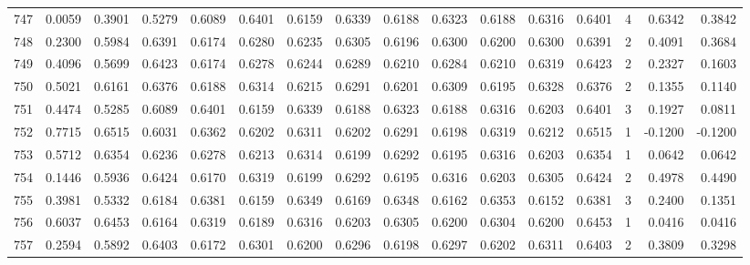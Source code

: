 \begin{tabular}{lrrrrrrrrrrrrrrr}
747 &      0.0059 &  0.3901 &  0.5279 &  0.6089 &  0.6401 &  0.6159 &  0.6339 &  0.6188 &  0.6323 &  0.6188 &   0.6316 &     0.6401 &      4 &                    0.6342 &                     0.3842 \\
748 &      0.2300 &  0.5984 &  0.6391 &  0.6174 &  0.6280 &  0.6235 &  0.6305 &  0.6196 &  0.6300 &  0.6200 &   0.6300 &     0.6391 &      2 &                    0.4091 &                     0.3684 \\
749 &      0.4096 &  0.5699 &  0.6423 &  0.6174 &  0.6278 &  0.6244 &  0.6289 &  0.6210 &  0.6284 &  0.6210 &   0.6319 &     0.6423 &      2 &                    0.2327 &                     0.1603 \\
750 &      0.5021 &  0.6161 &  0.6376 &  0.6188 &  0.6314 &  0.6215 &  0.6291 &  0.6201 &  0.6309 &  0.6195 &   0.6328 &     0.6376 &      2 &                    0.1355 &                     0.1140 \\
751 &      0.4474 &  0.5285 &  0.6089 &  0.6401 &  0.6159 &  0.6339 &  0.6188 &  0.6323 &  0.6188 &  0.6316 &   0.6203 &     0.6401 &      3 &                    0.1927 &                     0.0811 \\
752 &      0.7715 &  0.6515 &  0.6031 &  0.6362 &  0.6202 &  0.6311 &  0.6202 &  0.6291 &  0.6198 &  0.6319 &   0.6212 &     0.6515 &      1 &                   -0.1200 &                    -0.1200 \\
753 &      0.5712 &  0.6354 &  0.6236 &  0.6278 &  0.6213 &  0.6314 &  0.6199 &  0.6292 &  0.6195 &  0.6316 &   0.6203 &     0.6354 &      1 &                    0.0642 &                     0.0642 \\
754 &      0.1446 &  0.5936 &  0.6424 &  0.6170 &  0.6319 &  0.6199 &  0.6292 &  0.6195 &  0.6316 &  0.6203 &   0.6305 &     0.6424 &      2 &                    0.4978 &                     0.4490 \\
755 &      0.3981 &  0.5332 &  0.6184 &  0.6381 &  0.6159 &  0.6349 &  0.6169 &  0.6348 &  0.6162 &  0.6353 &   0.6152 &     0.6381 &      3 &                    0.2400 &                     0.1351 \\
756 &      0.6037 &  0.6453 &  0.6164 &  0.6319 &  0.6189 &  0.6316 &  0.6203 &  0.6305 &  0.6200 &  0.6304 &   0.6200 &     0.6453 &      1 &                    0.0416 &                     0.0416 \\
757 &      0.2594 &  0.5892 &  0.6403 &  0.6172 &  0.6301 &  0.6200 &  0.6296 &  0.6198 &  0.6297 &  0.6202 &   0.6311 &     0.6403 &      2 &                    0.3809 &                     0.3298 \\

\end{tabular}
